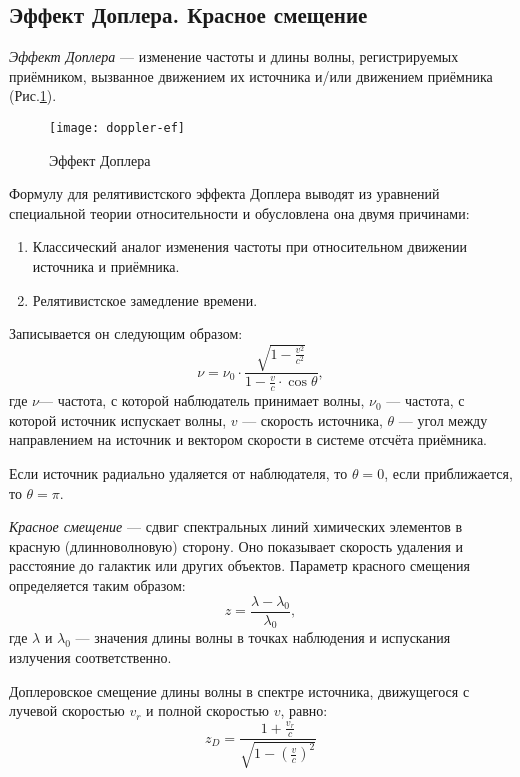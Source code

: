 \subsection{Эффект Доплера. Красное смещение} 
\textit{Эффект Доплера} --- изменение частоты и длины волны, регистрируемых  приёмником, вызванное движением их источника и/или движением приёмника (Рис.\ref{doppler-ef}).

\begin{figure}[h!]\centering
\texttt{[image: doppler-ef]}
\caption{Эффект Доплера}\label{doppler-ef}
\end{figure}

Формулу для релятивистского эффекта Доплера выводят из уравнений  специальной теории относительности и обусловлена она двумя причинами:
\begin{enumerate}
\item Классический аналог изменения частоты при относительном движении источника и приёмника.
\item Релятивистское замедление времени.
\end{enumerate}

Записывается он следующим образом:
\begin{equation}
\nu=\nu_0\cdot\frac{\sqrt{1-\frac{v^2}{c^2}}}{1-\frac{v}{c}\cdot\cos\theta},
\end{equation}
где $\nu$--- частота, с которой наблюдатель принимает волны, $\nu_0$ --- частота, с которой источник испускает волны, $v$ --- скорость источника, $\theta$ --- угол между направлением на источник и вектором скорости в системе отсчёта приёмника. 

Если источник радиально удаляется от наблюдателя, то $\theta =0$, если приближается, то $\theta =\pi$.

\textit{Красное смещение} --- сдвиг спектральных линий химических элементов в красную (длинноволновую) сторону. Оно показывает скорость удаления и расстояние до галактик или других объектов. Параметр красного смещения определяется таким образом:
\begin{equation}
z=\frac{\lambda-\lambda_0}{\lambda_0},
\end{equation}
где $\lambda$ и $\lambda _{0}$ --- значения длины волны в точках наблюдения и испускания излучения соответственно.

Доплеровское смещение длины волны в спектре источника, движущегося с лучевой скоростью $v_{r}$ и полной скоростью $v$, равно:
\begin{equation}
z_D=\frac{1+\frac{v_r}{c}}{\sqrt{1-\left(\frac{v}{c}\right)^2}}
\end{equation}

